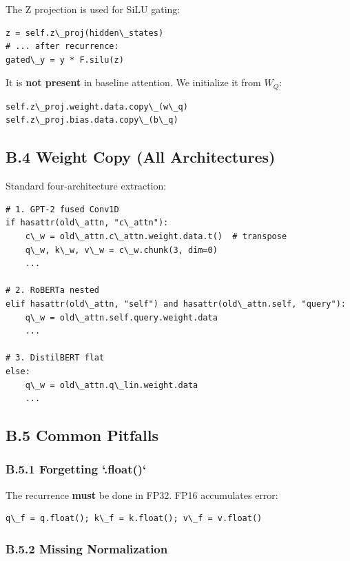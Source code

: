 The Z projection is used for SiLU gating:

\begin{lstlisting}
z = self.z\_proj(hidden\_states)
# ... after recurrence:
gated\_y = y * F.silu(z)
\end{lstlisting}

It is \textbf{not present} in baseline attention. We initialize it from $W_Q$:

\begin{lstlisting}
self.z\_proj.weight.data.copy\_(w\_q)
self.z\_proj.bias.data.copy\_(b\_q)
\end{lstlisting}

\subsection{B.4 Weight Copy (All Architectures)}

Standard four-architecture extraction:

\begin{lstlisting}
# 1. GPT-2 fused Conv1D
if hasattr(old\_attn, "c\_attn"):
    c\_w = old\_attn.c\_attn.weight.data.t()  # transpose
    q\_w, k\_w, v\_w = c\_w.chunk(3, dim=0)
    ...

# 2. RoBERTa nested
elif hasattr(old\_attn, "self") and hasattr(old\_attn.self, "query"):
    q\_w = old\_attn.self.query.weight.data
    ...

# 3. DistilBERT flat
else:
    q\_w = old\_attn.q\_lin.weight.data
    ...
\end{lstlisting}

\subsection{B.5 Common Pitfalls}

\subsubsection{B.5.1 Forgetting `.float()`}

The recurrence \textbf{must} be done in FP32. FP16 accumulates error:

\begin{lstlisting}
q\_f = q.float(); k\_f = k.float(); v\_f = v.float()
\end{lstlisting}

\subsubsection{B.5.2 Missing Normalization}

